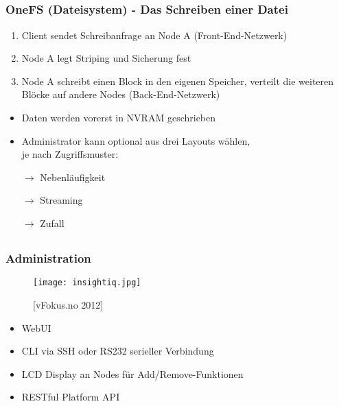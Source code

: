\documentclass{beamer}
\begin{document}
\subsection{}
\begin{frame}[fragile]
  \frametitle{OneFS (Dateisystem) - Das Schreiben einer Datei}
  
  \begin{enumerate}
    \item Client sendet Schreibanfrage an Node A (Front-End-Netzwerk)
    \item Node A legt Striping und Sicherung fest
    \item Node A schreibt einen Block in den eigenen Speicher,
    verteilt die weiteren Blöcke auf andere Nodes (Back-End-Netzwerk)
    \end{enumerate}
  
  \begin{itemize}
    \item Daten werden vorerst in NVRAM geschrieben 
    \item Administrator kann optional aus drei Layouts wählen, \\
    je nach Zugriffsmuster:
    \vspace{2mm}
    \item[$\rightarrow$] Nebenläufigkeit 
    \item[$\rightarrow$] Streaming
    \item[$\rightarrow$] Zufall
        
  \end{itemize}
  
  

\end{frame}

      

\subsection{}
\begin{frame}[fragile]
  \frametitle{Administration}
  
  \begin{figure}[htp]
    \centering
    \texttt{[image: insightiq.jpg]}
    \caption{[vFokus.no 2012]}
  \end{figure}
  
  \vspace{-5mm}

  \begin{itemize}
    \item WebUI
    \item CLI via SSH oder RS232 serieller Verbindung
    \item LCD Display an Nodes für Add/Remove-Funktionen
    \item RESTful Platform API
  \end{itemize}

\end{frame}  
\end{document}
